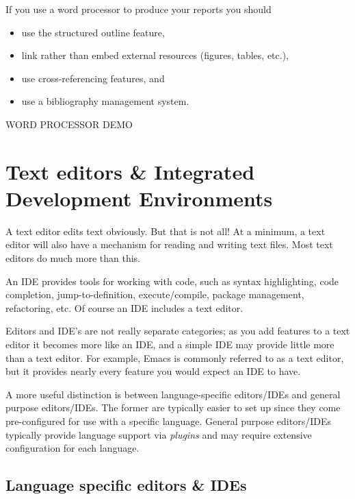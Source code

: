 \documentclass[
]{book}
\providecommand{\tightlist}{%
  \setlength{\itemsep}{0pt}\setlength{\parskip}{0pt}}
\begin{document}
If you use a word processor to produce your reports you should

\begin{itemize}
\tightlist
\item
  use the structured outline feature,
\item
  link rather than embed external resources (figures, tables, etc.),
\item
  use cross-referencing features, and
\item
  use a bibliography management system.
\end{itemize}

WORD PROCESSOR DEMO

\hypertarget{text-editors-integrated-development-environments}{%
\section{Text editors \& Integrated Development Environments}\label{text-editors-integrated-development-environments}}

A text editor edits text obviously. But that is not all! At a minimum, a text editor will also have a mechanism for reading and writing text files. Most text editors do much more than this.

An IDE provides tools for working with code, such as syntax highlighting, code completion, jump-to-definition, execute/compile, package management, refactoring, etc. Of course an IDE includes a text editor.

Editors and IDE's are not really separate categories; as you add features to a text editor it becomes more like an IDE, and a simple IDE may provide little more than a text editor. For example, Emacs is commonly referred to as a text editor, but it provides nearly every feature you would expect an IDE to have.

A more useful distinction is between language-specific editors/IDEs and general purpose editors/IDEs. The former are typically easier to set up since they come pre-configured for use with a specific language. General purpose editors/IDEs typically provide language support via \emph{plugins} and may require extensive configuration for each language.

\hypertarget{language-specific-editors-ides}{%
\subsection{Language specific editors \& IDEs}\label{language-specific-editors-ides}}
\end{document}
